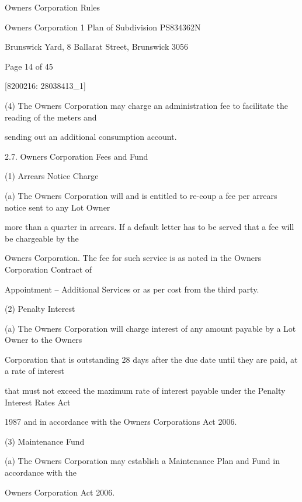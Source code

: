 \documentclass{article}
\begin{document}
{\fontsize{9}{1}Owners Corporation Rules }

{\fontsize{9}{1}Owners Corporation 1 Plan of Subdivision PS834362N }

{\fontsize{9}{1}Brunswick Yard, 8 Ballarat Street, Brunswick 3056 }


{\fontsize{9}{1}Page 14  of 45 }



{\fontsize{7.02}{1}[8200216: 28038413\_1] }


{\fontsize{9.962}{1}(4) The Owners Corporation may charge an administration fee to facilitate the reading of the meters and }

{\fontsize{10.02}{1}sending out an additional consumption account. }

{\fontsize{9.99}{1}2.7. Owners Corporation Fees and Fund }

{\fontsize{9.962}{1}(1) Arrears Notice Charge }

{\fontsize{9.962}{1}(a) The Owners Corporation will and is entitled to re-coup a fee per arrears notice sent to any Lot Owner }

{\fontsize{10.02}{1}more than a quarter in arrears. If a default letter has to be served that a fee will be chargeable by the }

{\fontsize{10.02}{1}Owners Corporation. The fee for such service is as noted in the Owners Corporation Contract of }

{\fontsize{10.02}{1}Appointment – Additional Services or as per cost from the third party. }

{\fontsize{9.962}{1}(2) Penalty Interest }

{\fontsize{9.962}{1}(a) The Owners Corporation will charge interest of any amount payable by a Lot Owner to the Owners }

{\fontsize{10.02}{1}Corporation that is outstanding 28 days after the due date until they are paid, at a rate of interest }

{\fontsize{10.02}{1}that must not exceed the maximum rate of interest payable under the Penalty Interest Rates Act }

{\fontsize{10.02}{1}1987 and in accordance with the Owners Corporations Act 2006. }

{\fontsize{9.962}{1}(3) Maintenance Fund }

{\fontsize{9.962}{1}(a) The Owners Corporation may establish a Maintenance Plan and Fund in accordance with the }

{\fontsize{10.02}{1}Owners Corporation Act 2006. }
\end{document}
